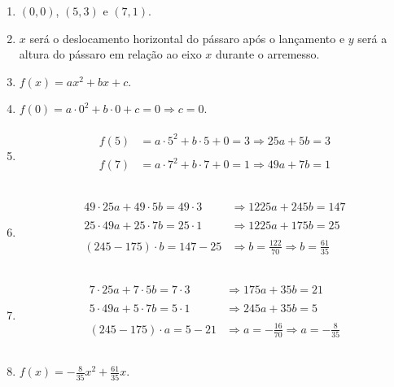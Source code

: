 \documentclass[10 pt,usenames,dvipsnames, oneside]{article}
\begin{document}
\ifdefined\prof
\begin{solucao}

\begin{enumerate}
\item {} 
\((0,0)\), \((5,3)\) e \((7,1)\).

\item {} 
\(x\) será o deslocamento horizontal do pássaro após o lançamento e \(y\) será a altura do pássaro em relação ao eixo \(x\) durante o arremesso.

\item {} 
\(f(x)=ax^2+bx+c\).

\item {} 
\(f(0)=a \cdot 0^2+b \cdot 0+c=0 \Rightarrow c=0\).

\item {} \begin{align*}\!\begin{aligned}
f(5)& =a \cdot 5^2+b \cdot 5+0=3 \Rightarrow 25a+5b=3 \\\\
f(7)& =a \cdot 7^2+b \cdot 7+0=1 \Rightarrow 49a+7b=1 \\\\
\end{aligned}\end{align*}
\item {} \begin{align*}\!\begin{aligned}
49 \cdot 25a+ 49 \cdot 5b= 49 \cdot 3 & \Rightarrow 1225a+245b=147 \\\\
25 \cdot 49a+ 25 \cdot 7b = 25 \cdot 1 & \Rightarrow 1225a+175b=25 \\\\
(245-175) \cdot b = 147-25 & \Rightarrow b= \frac{122}{70} \Rightarrow b= \frac{61}{35} \\\\
\end{aligned}\end{align*}
\item {} \begin{align*}\!\begin{aligned}
7 \cdot 25a+ 7 \cdot 5b= 7 \cdot 3 & \Rightarrow 175a+35b=21 \\\\
5 \cdot 49a+ 5 \cdot 7b = 5 \cdot 1 & \Rightarrow 245a+35b=5 \\\\
(245-175) \cdot a = 5-21 & \Rightarrow a= - \frac{16}{70} \Rightarrow a=- \frac{8}{35} \\\\
\end{aligned}\end{align*}
\item {} 
\(f(x)= - \frac{8}{35}x^2+ \frac{61}{35}x\).

\end{enumerate}
\end{solucao}
\fi
\end{document}
